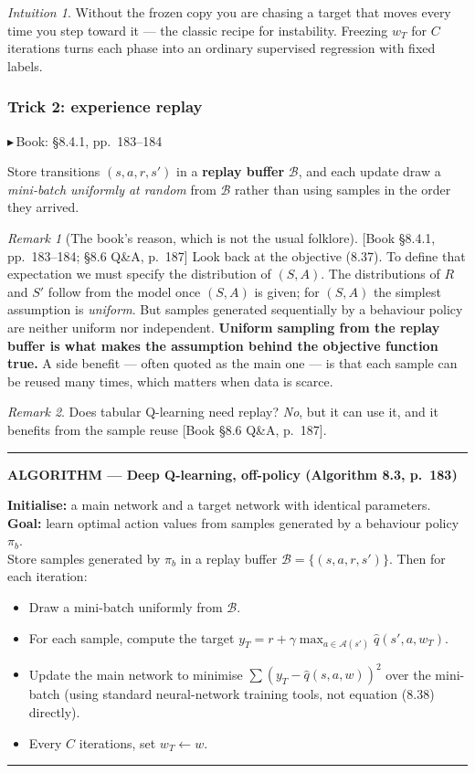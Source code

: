 \documentclass[11pt, letterpaper]{article}
\theoremstyle{runin}
\theoremstyle{runinplain}
\theoremstyle{remark}
\newtheorem*{remark}{Remark}
\newtheorem*{intuition}{Intuition}
\newcommand{\Aspace}{\mathcal{A}}
\newcommand{\bk}[1]{{\color{bookblue}\small$\blacktriangleright$\,\textsf{Book: #1}}}
\newcommand{\bkin}[1]{{\color{bookblue}\small[\textsf{Book #1}]}}
\newenvironment{algobox}[1]
  {\par\medskip\noindent\rule{\textwidth}{0.9pt}\par\nobreak\vspace{0.25em}
   \noindent\textbf{\small ALGORITHM --- #1}\par\nobreak\vspace{0.15em}
   \small}
  {\par\nobreak\vspace{0.25em}\noindent\rule{\textwidth}{0.9pt}\par\medskip}
\begin{document}
\begin{intuition}
Without the frozen copy you are chasing a target that moves every time you step
toward it --- the classic recipe for instability. Freezing $w_T$ for $C$ iterations
turns each phase into an ordinary supervised regression with fixed labels.
\end{intuition}

\subsubsection{Trick 2: experience replay}

\bk{\S8.4.1, pp.~183--184}

Store transitions $(s,a,r,s')$ in a \textbf{replay buffer}
$\mathcal B$, and each update draw a \emph{mini-batch uniformly at random} from
$\mathcal B$ rather than using samples in the order they arrived.

\begin{remark}[The book's reason, which is not the usual folklore]
\bkin{\S8.4.1, pp.~183--184; \S8.6 Q\&A, p.~187} Look back at the objective (8.37).
To define that expectation we must specify the distribution of $(S,A)$. The
distributions of $R$ and $S'$ follow from the model once $(S,A)$ is given; for
$(S,A)$ the simplest assumption is \emph{uniform}. But samples generated
sequentially by a behaviour policy are neither uniform nor independent.
\textbf{Uniform sampling from the replay buffer is what makes the assumption behind
the objective function true.} A side benefit --- often quoted as the main one --- is
that each sample can be reused many times, which matters when data is scarce.
\end{remark}

\begin{remark}
Does tabular Q-learning need replay? \emph{No}, but it can use it, and it benefits
from the sample reuse \bkin{\S8.6 Q\&A, p.~187}.
\end{remark}

\begin{algobox}{Deep Q-learning, off-policy (Algorithm 8.3, p.~183)}
\textbf{Initialise:} a main network and a target network with identical parameters.\\
\textbf{Goal:} learn optimal action values from samples generated by a behaviour
policy $\pi_b$.\\
Store samples generated by $\pi_b$ in a replay buffer
$\mathcal B=\{(s,a,r,s')\}$. Then for each iteration:
\begin{itemize}\itemsep0pt
  \item Draw a mini-batch uniformly from $\mathcal B$.
  \item For each sample, compute the target
        $y_T=r+\gamma\max_{a\in\Aspace(s')}\hat q(s',a,w_T)$.
  \item Update the main network to minimise $\sum(y_T-\hat q(s,a,w))^2$ over the
        mini-batch (using standard neural-network training tools, not equation
        (8.38) directly).
  \item Every $C$ iterations, set $w_T\leftarrow w$.
\end{itemize}
\end{algobox}
\end{document}

